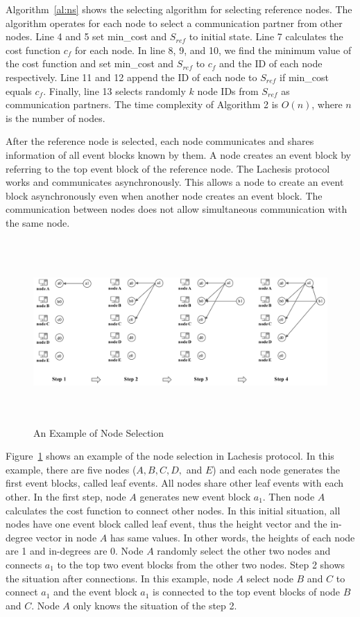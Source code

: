 \documentclass{article}
\begin{document}
Algorithm~\ref{al:ns} shows the selecting algorithm for selecting reference nodes. The algorithm operates for each node to select a communication partner from other nodes. Line 4 and 5 set min\_cost and $S_{ref}$ to initial state. Line 7 calculates the cost function $c_f$ for each node. In line 8, 9, and 10, we find the minimum value of the cost function and set min\_cost and $S_{ref}$ to $c_f$ and the ID of each node respectively. Line 11 and 12 append the ID of each node to $S_{ref}$ if min\_cost equals $c_f$. Finally, line 13 selects randomly $k$ node IDs from $S_{ref}$ as communication partners. The time complexity of Algorithm 2 is $O(n)$, where $n$ is the number of nodes. 

After the reference node is selected, each node communicates and shares information of all event blocks known by them. A node creates an event block by referring to the top event block of the reference node. The Lachesis protocol works and communicates asynchronously. This allows a node to create an event block asynchronously even when another node creates an event block. The communication between nodes does not allow simultaneous communication with the same node. 

\begin{figure}[H] \centering  
\includegraphics[height=7cm, width=1.0\columnwidth]{node_selection.pdf}
\caption{An Example of Node Selection}
\label{fig:node_selection}
\end{figure}

Figure~\ref{fig:node_selection} shows an example of the node selection in Lachesis protocol. In this example, there are five nodes ($A, B, C, D,$ and $E$) and each node generates the first event blocks, called leaf events. All nodes share other leaf events with each other. In the first step, node $A$ generates new event block $a_1$. Then node $A$ calculates the cost function to connect other nodes. In this initial situation, all nodes have one event block called leaf event, thus the height vector and the in-degree vector in node $A$ has same values. In other words, the heights of each node are 1 and in-degrees are 0. Node $A$ randomly select the other two nodes and connects $a_1$ to the top two event blocks from the other two nodes. Step 2 shows the situation after connections. In this example, node $A$ select node $B$ and $C$ to connect $a_1$ and the event block $a_1$ is connected to the top event blocks of node $B$ and $C$. Node $A$ only knows the situation of the step 2. 
\end{document}
